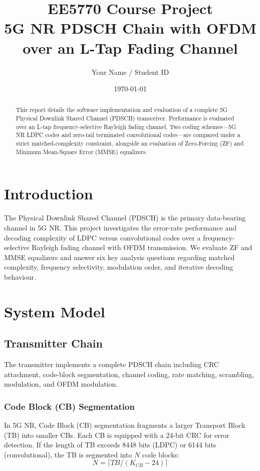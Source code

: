 \documentclass[12pt, a4paper]{article}
\title{\textbf{EE5770 Course Project}\\ 5G NR PDSCH Chain with OFDM over an L-Tap Fading Channel}
\author{Your Name / Student ID}
\date{\today}
\begin{document}
\maketitle

\begin{abstract}
This report details the software implementation and evaluation of a complete 5G Physical Downlink Shared Channel (PDSCH) transceiver. Performance is evaluated over an L-tap frequency-selective Rayleigh fading channel. Two coding schemes---5G NR LDPC codes and zero-tail terminated convolutional codes---are compared under a strict matched-complexity constraint, alongside an evaluation of Zero-Forcing (ZF) and Minimum Mean-Square Error (MMSE) equalizers.
\end{abstract}

\newpage
\tableofcontents
\newpage

\section{Introduction}
The Physical Downlink Shared Channel (PDSCH) is the primary data-bearing channel in 5G NR. This project investigates the error-rate performance and decoding complexity of LDPC versus convolutional codes over a frequency-selective Rayleigh fading channel with OFDM transmission. We evaluate ZF and MMSE equalizers and answer six key analysis questions regarding matched complexity, frequency selectivity, modulation order, and iterative decoding behaviour.

\section{System Model}

\subsection{Transmitter Chain}
The transmitter implements a complete PDSCH chain including CRC attachment, code-block segmentation, channel coding, rate matching, scrambling, modulation, and OFDM modulation.

\subsubsection{Code Block (CB) Segmentation}
In 5G NR, Code Block (CB) segmentation fragments a larger Transport Block (TB) into smaller CBs. Each CB is equipped with a 24-bit CRC for error detection. If the length of TB exceeds 8448 bits (LDPC) or 6144 bits (convolutional), the TB is segmented into $N$ code blocks:
\[N = \lceil TB/(K_{CB} - 24)\rceil\]
\end{document}
